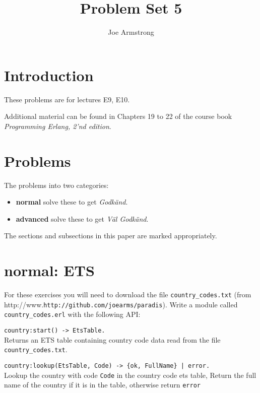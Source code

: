 \documentclass[12pt]{hitec}
\title{Problem Set 5}
\author{Joe Armstrong}
\begin{document}
\maketitle

\tableofcontents

\section{Introduction}
These problems are for lectures E9, E10.

Additional material can be found in Chapters 19 to 22 of the course book
{\sl Programming Erlang, 2'nd edition}.

\section{Problems}

The problems into two categories:

\begin{itemize}
\item {\bf normal} solve these to get {\sl Godk\"{a}nd}.
\item {\bf advanced} solve these to get {\sl V\"{a}l Godk\"{a}nd}.
\end{itemize}

The sections and subsections in this paper are marked appropriately.

\section{normal: ETS}

For these exercises you will need to download the file \verb+country_codes.txt+ (from
http://www.\verb+http://github.com/joearms/paradis+). Write a module called
\verb+country_codes.erl+ with the following API:

\begin{description}
\item \verb+country:start() -> EtsTable.+\\
Returns an ETS table containing country code data read from the file
\verb+country_codes.txt+.
\item \verb+country:lookup(EtsTable, Code) -> {ok, FullName} | error.+\\
Lookup the country with code \verb+Code+ in the country code ets table,
Return the full name of the country if it is in the table, otherwise return
\verb+error+
\end{description}
\end{document}

